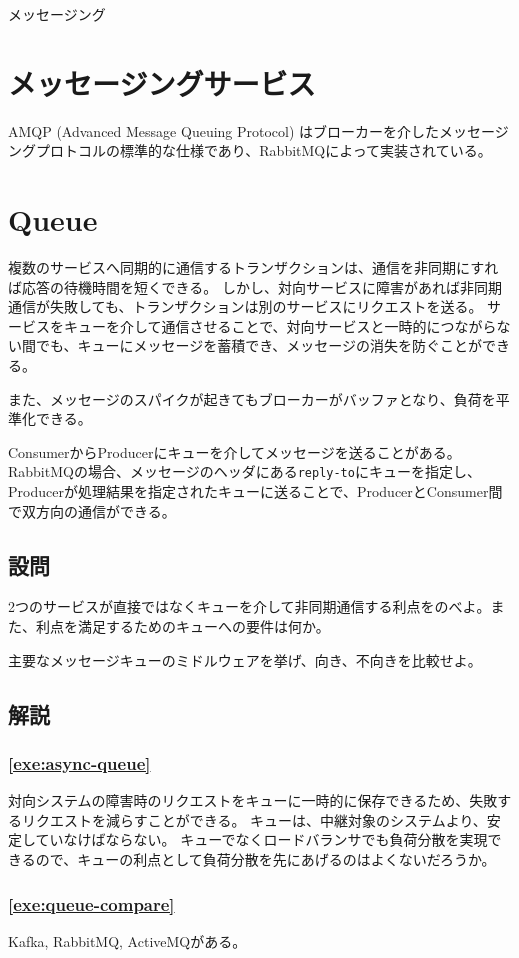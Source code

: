 \documentclass[book]{jlreq}
\begin{document}
\begin{chapter-bib}{メッセージング}
  \section{メッセージングサービス}
  AMQP (Advanced Message Queuing Protocol) はブローカーを介したメッセージングプロトコルの標準的な仕様であり、RabbitMQによって実装されている\cite{rabbitmq-amqp}。

  \section{Queue} 
  複数のサービスへ同期的に通信するトランザクションは、通信を非同期にすれば応答の待機時間を短くできる。
  しかし、対向サービスに障害があれば非同期通信が失敗しても、トランザクションは別のサービスにリクエストを送る。
  サービスをキューを介して通信させることで、対向サービスと一時的につながらない間でも、キューにメッセージを蓄積でき、メッセージの消失を防ぐことができる\cite{lc-isc}。
  
  また、メッセージのスパイクが起きてもブローカーがバッファとなり、負荷を平準化できる。

  ConsumerからProducerにキューを介してメッセージを送ることがある\cite{microsoft-messaging}。
  RabbitMQの場合、メッセージのヘッダにある\texttt{reply-to}にキューを指定し、Producerが処理結果を指定されたキューに送ることで、ProducerとConsumer間で双方向の通信ができる\cite{rabbitmq-direct-reply-to}。
  \subsection{設問}
  \begin{exercise}
  \item 2つのサービスが直接ではなくキューを介して非同期通信する利点をのべよ。また、利点を満足するためのキューへの要件は何か。\label{exe:async-queue}
  \item 主要なメッセージキューのミドルウェアを挙げ、向き、不向きを比較せよ。\label{exe:queue-compare}
  \end{exercise}
  \subsection{解説}
  \subsubsection*{\ref{exe:async-queue}}
  対向システムの障害時のリクエストをキューに一時的に保存できるため、失敗するリクエストを減らすことができる\cite{lc-isc}。
  キューは、中継対象のシステムより、安定していなけばならない。
  キューでなくロードバランサでも負荷分散を実現できるので、キューの利点として負荷分散を先にあげるのはよくないだろうか。
  \subsubsection*{\ref{exe:queue-compare}}
  Kafka, RabbitMQ, ActiveMQがある\cite{lc-isc}。
\end{chapter-bib}
\end{document}
